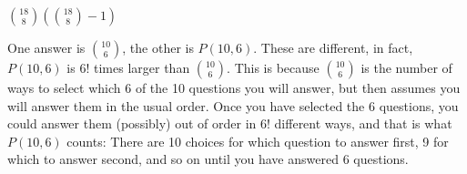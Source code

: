 \protect \documentclass [10pt]{exam}
\renewenvironment{Ans}[1]{\setcounter{question}{#1}\addtocounter{question}{-1}\question }{}
\begin{document}
\begin{questions}
\begin{Ans}{6}
\end{Ans}
\begin{Ans}{7}
  	
\end{Ans}
\begin{Ans}{8}
  		 ${18 \choose 8}\left({18 \choose 8} - 1\right)$
  	
\end{Ans}
\begin{Ans}{9}
  		 One answer is ${10 \choose 6}$, the other is $P(10, 6)$.  These are different, in fact, $P(10,6)$ is $6!$ times larger than ${10 \choose 6}$.  This is because ${10 \choose 6}$ is the number of ways to select which 6 of the 10 questions you will answer, but then assumes you will answer them in the usual order.  Once you have selected the 6 questions, you could answer them (possibly) out of order in 6! different ways, and that is what $P(10,6)$ counts: There are 10 choices for which question to answer first, 9 for which to answer second, and so on until you have answered 6 questions.
  	
\end{Ans}
\begin{Ans}{10}
\end{Ans}
\end{questions}
\end{document}
